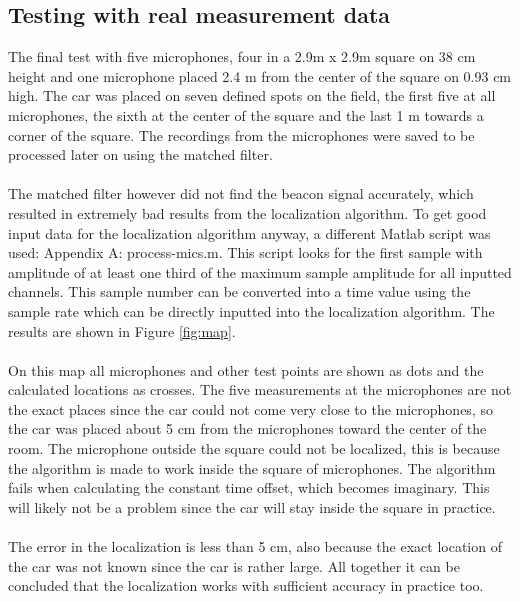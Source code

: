 \documentclass[final]{scrreprt} %
\begin{document}
\subsection{Testing with real measurement data}
The final test with five microphones, four in a 2.9m x 2.9m square on 38 cm height and one microphone placed 2.4 m from the center of the square on 0.93 cm high.
The car was placed on seven defined spots on the field, the first five at all microphones, the sixth at the center of the square and the last 1 m towards a corner of the square.
The recordings from the microphones were saved to be processed later on using the matched filter.
\\ \\
The matched filter however did not find the beacon signal accurately, which resulted in extremely bad results from the localization algorithm.
To get good input data for the localization algorithm anyway, a different Matlab script was used: Appendix A: process-mics.m.
This script looks for the first sample with amplitude of at least one third of the maximum sample amplitude for all inputted channels.
This sample number can be converted into a time value using the sample rate which can be directly inputted into the localization algorithm.
The results are shown in Figure \ref{fig:map}.
\\ \\
On this map all microphones and other test points are shown as dots and the calculated locations as crosses.
The five measurements at the microphones are not the exact places since the car could not come very close to the microphones, so the car was placed about 5 cm from the microphones toward the center of the room.
The microphone outside the square could not be localized, this is because the algorithm is made to work inside the square of microphones.
The algorithm fails when calculating the constant time offset, which becomes imaginary.
This will likely not be a problem since the car will stay inside the square in practice.
\\ \\
The error in the localization is less than 5 cm, also because the exact location of the car was not known since the car is rather large.
All together it can be concluded that the localization works with sufficient accuracy in practice too.
\end{document}
